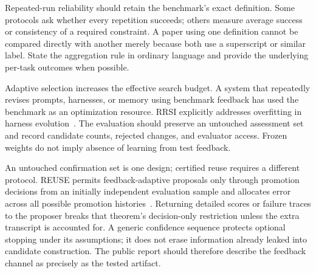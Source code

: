 Repeated-run reliability should retain the benchmark's exact definition. Some protocols ask whether every repetition succeeds; others measure average success or consistency of a required constraint. A paper using one definition cannot be compared directly with another merely because both use a superscript or similar label. State the aggregation rule in ordinary language and provide the underlying per-task outcomes when possible.

Adaptive selection increases the effective search budget. A system that repeatedly revises prompts, harnesses, or memory using benchmark feedback has used the benchmark as an optimization resource. RRSI explicitly addresses overfitting in harness evolution~\cite{rrsi2026}. The evaluation should preserve an untouched assessment set and record candidate counts, rejected changes, and evaluator access. Frozen weights do not imply absence of learning from test feedback.

An untouched confirmation set is one design; certified reuse requires a different protocol. REUSE permits feedback-adaptive proposals only through promotion decisions from an initially independent evaluation sample and allocates error across all possible promotion histories~\cite{ch02_reuse2026}. Returning detailed scores or failure traces to the proposer breaks that theorem's decision-only restriction unless the extra transcript is accounted for. A generic confidence sequence protects optional stopping under its assumptions; it does not erase information already leaked into candidate construction. The public report should therefore describe the feedback channel as precisely as the tested artifact.

